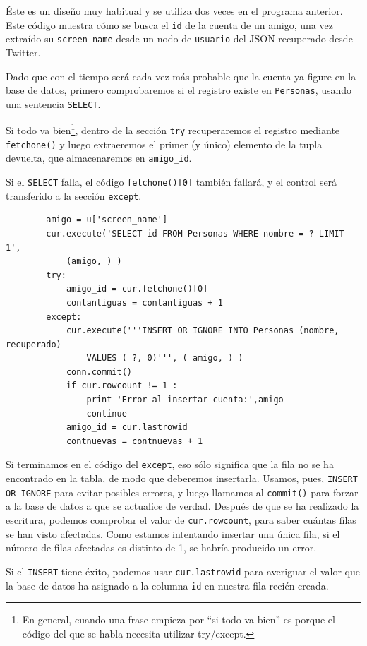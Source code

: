 Éste es un diseño muy habitual y se utiliza dos veces en el programa anterior.
Este código muestra cómo se busca el {\tt id} de la
cuenta de un amigo, una vez extraído su \verb"screen_name"
desde un nodo de {\tt usuario} del JSON recuperado desde Twitter.

Dado que con el tiempo será cada vez más probable que la cuenta
ya figure en la base de datos, primero comprobaremos si el registro
existe en {\tt Personas}, usando una sentencia {\tt SELECT}.

Si todo va bien\footnote{En general, cuando una frase empieza por
``si todo va bien''	es porque el código del que se habla necesita
utilizar try/except.}, dentro de la sección {\tt try} recuperaremos el
registro mediante {\tt fetchone()} y luego extraeremos el
primer (y único) elemento de la tupla devuelta, que almacenaremos en
\verb"amigo_id".

Si el {\tt SELECT} falla, el código {\tt fetchone()[0]} también fallará,
y el control será transferido a la sección {\tt except}.

\beforeverb
\begin{verbatim}
        amigo = u['screen_name']
        cur.execute('SELECT id FROM Personas WHERE nombre = ? LIMIT 1',
            (amigo, ) )
        try:
            amigo_id = cur.fetchone()[0]
            contantiguas = contantiguas + 1
        except:
            cur.execute('''INSERT OR IGNORE INTO Personas (nombre, recuperado) 
                VALUES ( ?, 0)''', ( amigo, ) )
            conn.commit()
            if cur.rowcount != 1 :
                print 'Error al insertar cuenta:',amigo
                continue
            amigo_id = cur.lastrowid
            contnuevas = contnuevas + 1
\end{verbatim}
\afterverb
%
Si terminamos en el código del {\tt except}, eso sólo significa que la fila
no se ha encontrado en la tabla, de modo que deberemos insertarla. Usamos, pues,
{\tt INSERT OR IGNORE} para evitar posibles errores, y luego llamamos al {\tt commit()} para
forzar a la base de datos a que se actualice de verdad. Después de que se ha realizado la escritura,
podemos comprobar el valor de {\tt cur.rowcount}, para saber cuántas filas se han visto afectadas. Como
estamos intentando insertar una única fila, si el número de
filas afectadas es distinto de 1, se habría producido un error.

Si el {\tt INSERT} tiene éxito, podemos usar {\tt cur.lastrowid}
para averiguar el valor que la base de datos ha asignado a la columna {\tt id}
en nuestra fila recién creada.

